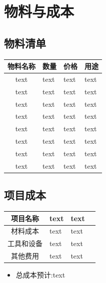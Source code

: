 \section{物料与成本}
\subsection{物料清单}
\begin{table}[h]
    \begin{tabular}{l|lll}
        \hline
        \multicolumn{1}{c|}{物料名称} & 数量   & 价格   & 用途   \\ \hline
        \multicolumn{1}{c|}{text} & text & text & text \\
        \multicolumn{1}{c|}{text} & text & text & text \\
        \multicolumn{1}{c|}{text} & text & text & text \\
        \multicolumn{1}{c|}{text} & text & text & text \\
        \multicolumn{1}{c|}{text} & text & text & text \\
        \multicolumn{1}{c|}{text} & text & text & text \\
        \multicolumn{1}{c|}{text} & text & text & text \\
        \multicolumn{1}{c|}{text} & text & text & text \\\hline
    \end{tabular}
\end{table}


\subsection{项目成本}
\begin{table}[h]
    \begin{tabular}{l|lll}
        \hline
        \multicolumn{1}{c|}{项目名称}  & text & text \\ \hline
        \multicolumn{1}{c|}{材料成本}  & text & text \\
        \multicolumn{1}{c|}{工具和设备} & text & text \\
        \multicolumn{1}{c|}{其他费用}  & text & text \\ \hline
    \end{tabular}
\end{table}
\begin{itemize}
    \item 总成本预计:text

\end{itemize}


